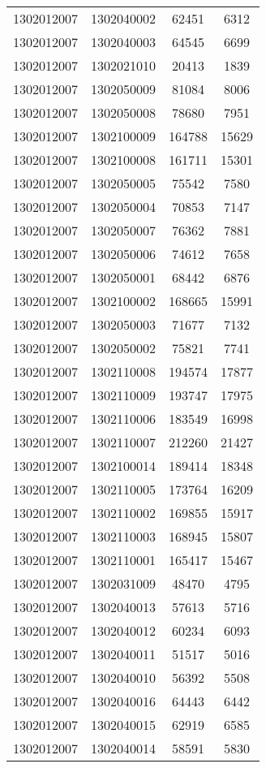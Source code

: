\begin{longtable}{llcc}
1302012007 & 1302040002 & 62451 & 6312\\
1302012007 & 1302040003 & 64545 & 6699\\
1302012007 & 1302021010 & 20413 & 1839\\
1302012007 & 1302050009 & 81084 & 8006\\
1302012007 & 1302050008 & 78680 & 7951\\
1302012007 & 1302100009 & 164788 & 15629\\
1302012007 & 1302100008 & 161711 & 15301\\
1302012007 & 1302050005 & 75542 & 7580\\
1302012007 & 1302050004 & 70853 & 7147\\
1302012007 & 1302050007 & 76362 & 7881\\
1302012007 & 1302050006 & 74612 & 7658\\
1302012007 & 1302050001 & 68442 & 6876\\
1302012007 & 1302100002 & 168665 & 15991\\
1302012007 & 1302050003 & 71677 & 7132\\
1302012007 & 1302050002 & 75821 & 7741\\
1302012007 & 1302110008 & 194574 & 17877\\
1302012007 & 1302110009 & 193747 & 17975\\
1302012007 & 1302110006 & 183549 & 16998\\
1302012007 & 1302110007 & 212260 & 21427\\
1302012007 & 1302100014 & 189414 & 18348\\
1302012007 & 1302110005 & 173764 & 16209\\
1302012007 & 1302110002 & 169855 & 15917\\
1302012007 & 1302110003 & 168945 & 15807\\
1302012007 & 1302110001 & 165417 & 15467\\
1302012007 & 1302031009 & 48470 & 4795\\
1302012007 & 1302040013 & 57613 & 5716\\
1302012007 & 1302040012 & 60234 & 6093\\
1302012007 & 1302040011 & 51517 & 5016\\
1302012007 & 1302040010 & 56392 & 5508\\
1302012007 & 1302040016 & 64443 & 6442\\
1302012007 & 1302040015 & 62919 & 6585\\
1302012007 & 1302040014 & 58591 & 5830\\

\end{longtable}
